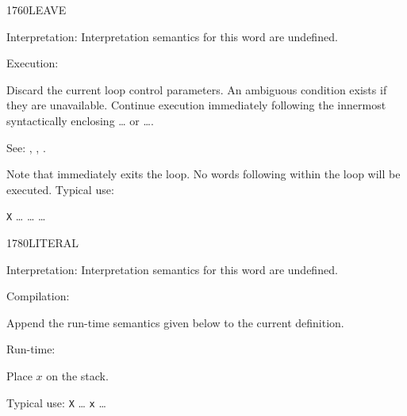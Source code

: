 \begin{newword*}{1760}{LEAVE}
\item[Interpretation:]
	Interpretation semantics for this word are undefined.

\item[Execution:]
	\stack{}{}

	Discard the current loop control parameters. An ambiguous
	condition exists if they are unavailable. Continue execution
	immediately following the innermost syntactically enclosing
	\ldots{} or \ldots{}.

\item[See:]
	,
	,
	.

	\begin{rationale} %
		Note that  immediately exits the loop. No words
		following  within the loop will be executed.
		Typical use:

		\tab \word{:} \texttt{X} {\ldots} 
			{\ldots} 
				{\ldots} 
		\word{;}
	\end{rationale}
\end{newword*}


\begin{newword*}{1780}{LITERAL}
\item[Interpretation:]
	Interpretation semantics for this word are undefined.

\item[Compilation:]

	Append the run-time semantics given below to the current
	definition.

\item[Run-time:]

	Place $x$ on the stack.

	\begin{rationale} %
		Typical use:
			\word{:} \texttt{X} {\ldots}
				\word{[} \texttt{x} \word{]} 
			{\ldots} \word{;}
	\end{rationale}
\end{newword*}


